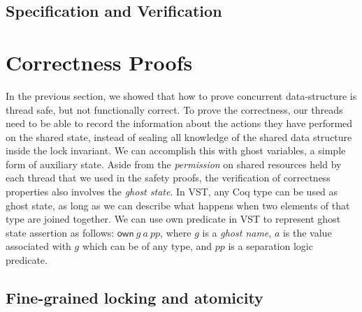 \documentclass[acmsmall,screen]{acmart}\settopmatter{printfolios=true}
\begin{document}
\subsection{Specification and Verification}
\section{Correctness Proofs}
In the previous section, we showed that how to prove concurrent data-structure is thread safe, but not functionally correct. To prove the correctness, our threads need to be able to record the information about the actions they have performed on the shared state, instead of sealing all knowledge of the shared data structure inside the lock invariant. We can accomplish this with ghost variables, a simple form of auxiliary state. Aside from the \emph{permission} on shared resources held by each thread that we used in the safety proofs, the verification of correctness properties also involves the \emph{ghost state}. In VST, any Coq type can be used as ghost state, as long as we can describe what happens when two elements of that type are joined together. We can use own predicate in VST to represent ghost state assertion as follows: $\mathsf{own}\ g\ a\ \mathit{pp}$, where $g$ is a \emph{ghost name}, $a$ is the value associated with $g$ which can be of any type, and $\mathit{pp}$ is a separation logic predicate. 



\subsection{Fine-grained locking and atomicity}
\end{document}

